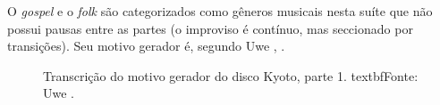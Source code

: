 O \emph{gospel} e o \emph{folk} são categorizados como gêneros musicais nesta suíte que não possui pausas entre as partes (o improviso é contínuo, mas seccionado por transições). Seu motivo gerador é, segundo Uwe , .

%  



\begin{figure}[!h]
  \centering
  
  \caption{Transcrição do motivo gerador do disco Kyoto, parte 1. textbf{Fonte}: Uwe .}
  \label{fig:Jarret_intro2}
\end{figure}

